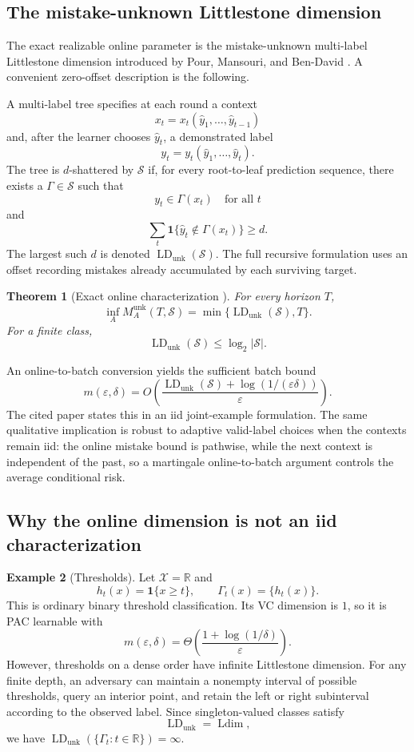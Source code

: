 \documentclass[11pt]{article}
\newtheorem{theorem}{Theorem}[section]
\theoremstyle{definition}
\newtheorem{example}[theorem]{Example}
\theoremstyle{remark}
\newcommand{\X}{\mathcal X}
\newcommand{\SV}{\mathcal S}
\newcommand{\eps}{\varepsilon}
\newcommand{\LDu}{\operatorname{LD}_{\mathrm{unk}}}
\newcommand{\1}{\mathbf 1}
\newcommand{\R}{\mathbb R}
\begin{document}
\subsection{The mistake-unknown Littlestone dimension}

The exact realizable online parameter is the mistake-unknown multi-label Littlestone dimension introduced by Pour, Mansouri, and Ben-David \cite{PourEtAl2026}. A convenient zero-offset description is the following.

A multi-label tree specifies at each round a context
\[
    x_t=x_t(\widehat y_1,\ldots,\widehat y_{t-1})
\]
and, after the learner chooses $\widehat y_t$, a demonstrated label
\[
    y_t=y_t(\widehat y_1,\ldots,\widehat y_t).
\]
The tree is $d$-shattered by $\SV$ if, for every root-to-leaf prediction sequence, there exists a $\Gamma\in\SV$ such that
\[
    y_t\in\Gamma(x_t)\quad\text{for all }t
\]
and
\[
    \sum_t \1\{\widehat y_t\notin\Gamma(x_t)\}\geq d.
\]
The largest such $d$ is denoted $\LDu(\SV)$. The full recursive formulation uses an offset recording mistakes already accumulated by each surviving target.

\begin{theorem}[Exact online characterization \cite{PourEtAl2026}]
For every horizon $T$,
\[
    \inf_A M_A^{\mathrm{unk}}(T,\SV)
    =
    \min\{\LDu(\SV),T\}.
\]
For a finite class,
\[
    \LDu(\SV)\leq\log_2|\SV|.
\]
\end{theorem}

An online-to-batch conversion yields the sufficient batch bound
\[
    m(\eps,\delta)
    =
    O\!\left(
        \frac{\LDu(\SV)+\log(1/(\eps\delta))}{\eps}
    \right).
\]
The cited paper states this in an iid joint-example formulation. The same qualitative implication is robust to adaptive valid-label choices when the contexts remain iid: the online mistake bound is pathwise, while the next context is independent of the past, so a martingale online-to-batch argument controls the average conditional risk.

\subsection{Why the online dimension is not an iid characterization}

\begin{example}[Thresholds]
Let $\X=\R$ and
\[
    h_t(x)=\1\{x\geq t\},
    \qquad
    \Gamma_t(x)=\{h_t(x)\}.
\]
This is ordinary binary threshold classification. Its VC dimension is $1$, so it is PAC learnable with
\[
    m(\eps,\delta)
    =\Theta\!\left(\frac{1+\log(1/\delta)}{\eps}\right).
\]
However, thresholds on a dense order have infinite Littlestone dimension. For any finite depth, an adversary can maintain a nonempty interval of possible thresholds, query an interior point, and retain the left or right subinterval according to the observed label. Since singleton-valued classes satisfy
\[
    \LDu=\operatorname{Ldim},
\]
we have $\LDu(\{\Gamma_t:t\in\R\})=\infty$.
\end{example}
\end{document}
